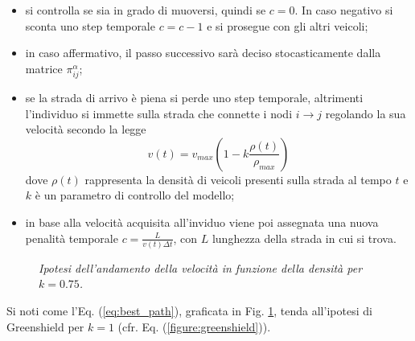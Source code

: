 \documentclass[../main.tex]{subfiles}
\begin{document}
\begin{itemize}
    \item si controlla se sia in grado di muoversi, quindi se $c = 0$. In caso negativo si sconta uno step temporale $c = c -1$ e si prosegue con gli altri veicoli;
    \item in caso affermativo, il passo successivo sarà deciso stocasticamente dalla matrice $\pi_{ij}^{\alpha}$;
    \item se la strada di arrivo \`e piena si perde uno step temporale, altrimenti l'individuo si immette sulla strada che connette i nodi $i \to j$ regolando la sua velocit\`a secondo la legge 
    \begin{equation}
        v(t) = v_{max}\left(1-k\frac{\rho(t)}{\rho_{max}}\right)
    \end{equation}
    dove $\rho(t)$ rappresenta la densit\`a di veicoli presenti sulla strada al tempo $t$ e $k$ \`e un parametro di controllo del modello;
    \item in base alla velocit\`a acquisita all'inviduo viene poi assegnata una nuova penalit\`a temporale $c = \frac{L}{v(t)\Delta t}$, con $L$ lunghezza della strada in cui si trova.
\end{itemize}
\begin{figure}[H]
    \centering
    \caption[Velocità nel modello]{\emph{Ipotesi dell'andamento della velocità in funzione della densità per $k = 0.75$.}}
    \label{figure:velocity}
\end{figure}
Si noti come l'Eq. (\ref{eq:best_path}), graficata in Fig. \ref{figure:velocity}, tenda all'ipotesi di Greenshield per $k = 1$ (cfr. Eq. (\ref{figure:greenshield})). 
\end{document}
